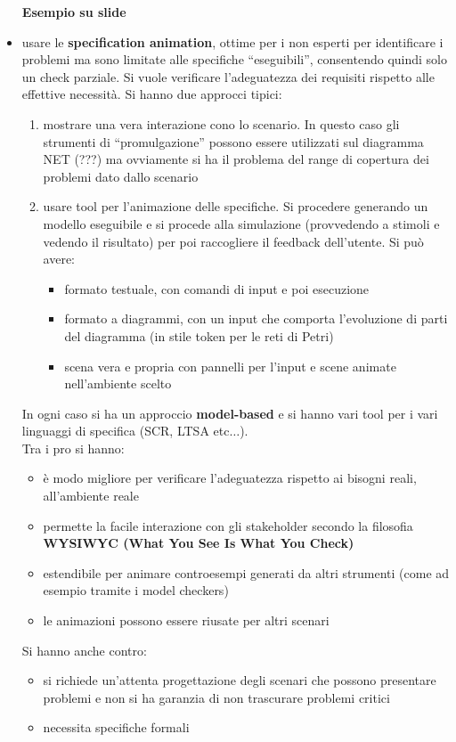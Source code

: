 \documentclass[a4paper,12pt, oneside]{book}
\begin{document}
\begin{itemize}
  \textbf{Esempio su slide}
  \item usare le \textbf{specification animation}, ottime per i non esperti per
  identificare i problemi ma sono limitate alle specifiche ``eseguibili'',
  consentendo quindi solo un check parziale. Si vuole verificare l'adeguatezza
  dei requisiti rispetto alle effettive necessità. Si hanno due approcci tipici:
  \begin{enumerate}
    \item mostrare una vera interazione cono lo scenario. In questo caso gli
    strumenti di ``promulgazione'' possono essere utilizzati sul diagramma NET
    (???) ma ovviamente si ha il problema del range di copertura dei problemi
    dato dallo scenario 
    \item usare tool per l'animazione delle specifiche. Si procedere generando
    un modello eseguibile e si procede alla simulazione (provvedendo a stimoli e
    vedendo il risultato) per poi raccogliere il feedback dell'utente. Si può
    avere:
    \begin{itemize}
      \item formato testuale, con comandi di input e poi esecuzione
      \item formato a diagrammi, con un input che comporta l'evoluzione di parti
      del diagramma (in stile token per le reti di Petri)
      \item scena vera e propria con pannelli per l'input e scene animate
      nell'ambiente scelto
    \end{itemize}
  \end{enumerate}
  In ogni caso si ha un approccio \textbf{model-based} e si hanno vari tool per
  i vari linguaggi di specifica (SCR, LTSA etc$\ldots$).\\
  Tra i pro si hanno:
  \begin{itemize}
    \item è modo migliore per verificare l'adeguatezza rispetto ai bisogni
    reali, all'ambiente reale
    \item permette la facile interazione con gli stakeholder secondo la
    filosofia \textbf{WYSIWYC (What You See Is What You Check)}
    \item estendibile per animare controesempi generati da altri strumenti (come
    ad esempio tramite i model checkers)
    \item le animazioni possono essere riusate per altri scenari
  \end{itemize}
  Si hanno anche contro:
  \begin{itemize}
    \item si richiede un'attenta progettazione degli scenari che possono presentare
    problemi e non si ha garanzia di non trascurare problemi critici
    \item necessita specifiche formali 
  \end{itemize}
  

\end{itemize}
\end{document}
